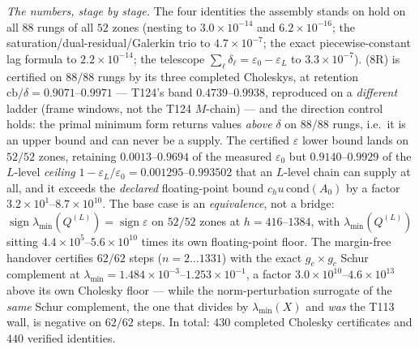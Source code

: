 \documentclass[11pt,a4paper]{article}
\begin{document}
\emph{The numbers, stage by stage.} The four identities the assembly stands on hold on all $88$
rungs of all $52$ zones (nesting to $3.0\times10^{-14}$ and $6.2\times10^{-16}$; the
saturation/dual-residual/Galerkin trio to $4.7\times10^{-7}$; the exact piecewise-constant lag
formula to $2.2\times10^{-14}$; the telescope $\sum_\ell\delta_\ell=\varepsilon_0-\varepsilon_L$ to
$3.3\times10^{-7}$). (8R) is certified on $88/88$ rungs by its three completed Choleskys, at
retention $\mathrm{cb}/\delta=0.9071$--$0.9971$ --- T124's band $0.4739$--$0.9938$, reproduced on a
\emph{different} ladder (frame windows, not the T124 $M$-chain) --- and the direction control holds:
the primal minimum form returns values \emph{above} $\delta$ on $88/88$ rungs, i.e.\ it is an upper
bound and can never be a supply. The certified $\varepsilon$ lower bound lands on $52/52$ zones,
retaining $0.0013$--$0.9694$ of the measured $\varepsilon_0$ but $0.9140$--$0.9929$ of the $L$-level
\emph{ceiling} $1-\varepsilon_L/\varepsilon_0=0.001295$--$0.993502$ that an $L$-level chain can
supply at all, and it exceeds the \emph{declared} floating-point bound $c_hu\,\mathrm{cond}(A_0)$ by a
factor $3.2\times10^{1}$--$8.7\times10^{10}$. The base case is an \emph{equivalence}, not a bridge:
$\operatorname{sign}\lambda_{\min}(Q^{(L)})=\operatorname{sign}\varepsilon$ on $52/52$ zones at
$h=416$--$1384$, with $\lambda_{\min}(Q^{(L)})$ sitting $4.4\times10^{5}$--$5.6\times10^{10}$ times
its own floating-point floor. The margin-free handover certifies $62/62$ steps ($n=2\ldots1331$) with
the exact $g_c\times g_c$ Schur complement at $\lambda_{\min}=1.484\times10^{-3}$--$1.253\times10^{-1}$,
a factor $3.0\times10^{10}$--$4.6\times10^{13}$ above its own Cholesky floor --- while the
norm-perturbation surrogate of the \emph{same} Schur complement, the one that divides by
$\lambda_{\min}(X)$ and \emph{was} the T113 wall, is negative on $62/62$ steps. In total: $430$
completed Cholesky certificates and $440$ verified identities.
\end{document}
